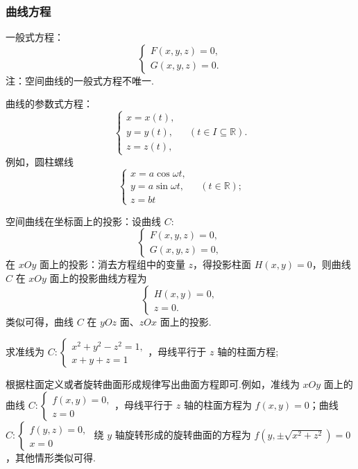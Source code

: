 \subsubsection{曲线方程}
\begin{zs}
    一般式方程：
  \[
  \begin{cases}
  F(x,y,z)=0, \\
  G(x,y,z)=0.
  \end{cases}
  \]
  注：空间曲线的一般式方程不唯一.
\end{zs}
\begin{zs}
    曲线的参数式方程：
  \[
  \begin{cases}
  x=x(t), \\
  y=y(t), \\
  z=z(t),
  \end{cases}
  \quad (t\in I\subseteq\mathbb{R}).
  \]
  例如，圆柱螺线
  \[
  \begin{cases}
  x=a\cos\omega t, \\
  y=a\sin\omega t, \\
  z=bt
  \end{cases}
  \quad (t\in\mathbb{R});
  \]
\end{zs}
\begin{zs}
    空间曲线在坐标面上的投影：设曲线 $C$:
\[
\begin{cases}
F(x,y,z)=0, \\
G(x,y,z)=0,
\end{cases}
\]
在 $xOy$ 面上的投影：消去方程组中的变量 $z$，得投影柱面 $H(x,y)=0$，则曲线 $C$ 在 $xOy$ 面上的投影曲线方程为
\[
\begin{cases}
H(x,y)=0, \\
z=0.
\end{cases}
\]
类似可得，曲线 $C$ 在 $yOz$ 面、$zOx$ 面上的投影.
\end{zs}
\begin{problem}
    求准线为 $C: \begin{cases} x^2+y^2-z^2=1, \\ x+y+z=1 \end{cases}$，母线平行于 $z$ 轴的柱面方程;
\end{problem}
\begin{note}
    根据柱面定义或者旋转曲面形成规律写出曲面方程即可.例如，准线为 $xOy$ 面上的曲线 $C: \begin{cases} f(x,y)=0, \\ z=0 \end{cases}$，母线平行于 $z$ 轴的柱面方程为 $f(x,y)=0$；曲线 $C: \begin{cases} f(y,z)=0, \\ x=0 \end{cases}$ 绕 $y$ 轴旋转形成的旋转曲面的方程为 $f(y,\pm\sqrt{x^2+z^2})=0$，其他情形类似可得.
\end{note}
